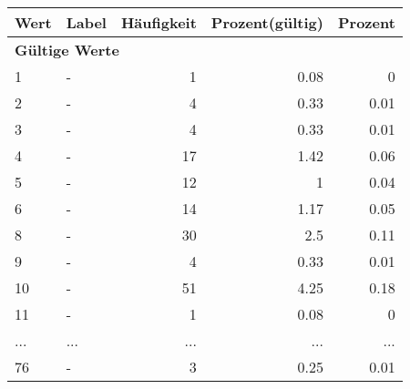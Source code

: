      \begin{longtable}{lXrrr}
     \toprule
     \textbf{Wert} & \textbf{Label} & \textbf{Häufigkeit} & \textbf{Prozent(gültig)} & \textbf{Prozent} \\
     \endhead
     \midrule
     \multicolumn{5}{l}{\textbf{Gültige Werte}}\\
        1 & \multicolumn{1}{X}{-} & %
          \num{1} &
          \num[round-mode=places,round-precision=2]{0.08} &
          \num[round-mode=places,round-precision=2]{0} \\
        2 & \multicolumn{1}{X}{-} & %
          \num{4} &
          \num[round-mode=places,round-precision=2]{0.33} &
          \num[round-mode=places,round-precision=2]{0.01} \\
        3 & \multicolumn{1}{X}{-} & %
          \num{4} &
          \num[round-mode=places,round-precision=2]{0.33} &
          \num[round-mode=places,round-precision=2]{0.01} \\
        4 & \multicolumn{1}{X}{-} & %
          \num{17} &
          \num[round-mode=places,round-precision=2]{1.42} &
          \num[round-mode=places,round-precision=2]{0.06} \\
        5 & \multicolumn{1}{X}{-} & %
          \num{12} &
          \num[round-mode=places,round-precision=2]{1} &
          \num[round-mode=places,round-precision=2]{0.04} \\
        6 & \multicolumn{1}{X}{-} & %
          \num{14} &
          \num[round-mode=places,round-precision=2]{1.17} &
          \num[round-mode=places,round-precision=2]{0.05} \\
        8 & \multicolumn{1}{X}{-} & %
          \num{30} &
          \num[round-mode=places,round-precision=2]{2.5} &
          \num[round-mode=places,round-precision=2]{0.11} \\
        9 & \multicolumn{1}{X}{-} & %
          \num{4} &
          \num[round-mode=places,round-precision=2]{0.33} &
          \num[round-mode=places,round-precision=2]{0.01} \\
        10 & \multicolumn{1}{X}{-} & %
          \num{51} &
          \num[round-mode=places,round-precision=2]{4.25} &
          \num[round-mode=places,round-precision=2]{0.18} \\
        11 & \multicolumn{1}{X}{-} & %
          \num{1} &
          \num[round-mode=places,round-precision=2]{0.08} &
          \num[round-mode=places,round-precision=2]{0} \\
       ... & ... & ... & ... & ... \\
        76 & \multicolumn{1}{X}{-} & %
          \num{3} &
          \num[round-mode=places,round-precision=2]{0.25} &
          \num[round-mode=places,round-precision=2]{0.01} \\


\end{longtable}
